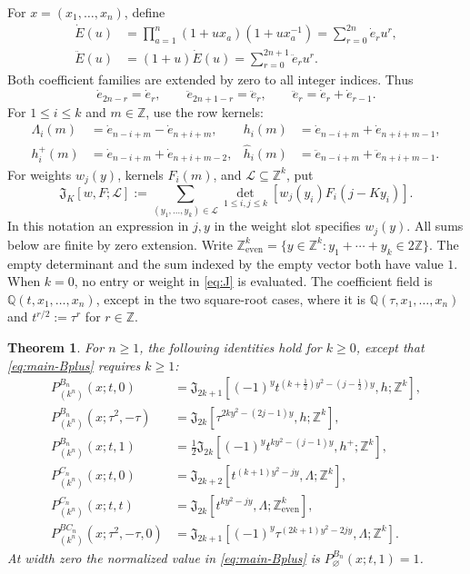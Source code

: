 \documentclass[12pt]{article}
\newtheorem{maintheorem}{Theorem}
\numberwithin{equation}{section}
\newcommand{\Q}{\mathbb Q}
\newcommand{\Z}{\mathbb Z}
\newcommand{\dote}{\dot e}
\newcommand{\ddote}{\ddot e}
\newcommand{\dotE}{\dot E}
\newcommand{\ddotE}{\ddot E}
\newcommand{\Jaff}{\mathfrak J}
\newcommand{\latticeeven}{\Z_{\mathrm{even}}^k}
\begin{document}
For $x=(x_1,\ldots,x_n)$, define
\begin{equation}\label{eq:elementary}
\begin{aligned}
 \dotE(u)&=\prod_{a=1}^n(1+ux_a)(1+ux_a^{-1})
          =\sum_{r=0}^{2n}\dote_r u^r,\\
 \ddotE(u)&=(1+u)\dotE(u)=\sum_{r=0}^{2n+1}\ddote_r u^r.
\end{aligned}
\end{equation}
Both coefficient families are extended by zero to all integer indices.
Thus
\[
 \dote_{2n-r}=\dote_r,\qquad
 \ddote_{2n+1-r}=\ddote_r,\qquad
 \ddote_r=\dote_r+\dote_{r-1}.
\]
For $1\le i\le k$ and $m\in\Z$, use the row kernels:
\begin{align*}
 \Lambda_i(m)&=\dote_{n-i+m}-\dote_{n+i+m},&
 h_i(m)&=\dote_{n-i+m}+\dote_{n+i+m-1},\\
 h_i^+(m)&=\dote_{n-i+m}+\dote_{n+i+m-2},&
 \widehat h_i(m)&=\ddote_{n-i+m}+\ddote_{n+i+m-1}.
\end{align*}
For weights $w_j(y)$, kernels $F_i(m)$, and
$\mathcal L\subseteq\Z^k$, put
\begin{equation}\label{eq:J}
 \Jaff_K[w,F;\mathcal L]
 :=\sum_{(y_1,\ldots,y_k)\in\mathcal L}
       \det_{1\le i,j\le k}[w_j(y_i)F_i(j-Ky_i)].
\end{equation}
In this notation an expression in $j,y$ in the weight slot specifies
$w_j(y)$.  All sums below are finite by zero extension.  Write
$\latticeeven=\{y\in\Z^k:y_1+\cdots+y_k\in2\Z\}$.
The empty determinant and the sum indexed by the empty vector both have
value $1$.  When $k=0$, no entry or weight in \eqref{eq:J} is evaluated.
The coefficient field is $\Q(t,x_1,\ldots,x_n)$, except in the
two square-root cases, where it is $\Q(\tau,x_1,\ldots,x_n)$ and
$t^{r/2}:=\tau^r$ for $r\in\Z$.

\begin{maintheorem}\label{thm:A}
For $n\ge1$, the following identities hold for $k\ge0$, except that
\eqref{eq:main-Bplus} requires $k\ge1$:
\begin{align}
 P_{(k^n)}^{B_n}(x;t,0)
 &=\Jaff_{2k+1}[(-1)^y t^{(k+\frac12)y^2-(j-\frac12)y},h;\Z^k],
 \label{eq:main-B0}\\
 P_{(k^n)}^{B_n}(x;\tau^2,-\tau)
 &=\Jaff_{2k}[\tau^{2ky^2-(2j-1)y},h;\Z^k],
 \label{eq:main-Bminus}\\
 P_{(k^n)}^{B_n}(x;t,1)
 &=\tfrac12\Jaff_{2k}[(-1)^y t^{ky^2-(j-1)y},h^+;\Z^k],
 \label{eq:main-Bplus}\\
 P_{(k^n)}^{C_n}(x;t,0)
 &=\Jaff_{2k+2}[t^{(k+1)y^2-jy},\Lambda;\Z^k],
 \label{eq:main-C0}\\
 P_{(k^n)}^{C_n}(x;t,t)
 &=\Jaff_{2k}[t^{ky^2-jy},\Lambda;\latticeeven],
 \label{eq:main-Ct}\\
 P_{(k^n)}^{BC_n}(x;\tau^2,-\tau,0)
 &=\Jaff_{2k+1}[(-1)^y\tau^{(2k+1)y^2-2jy},\Lambda;\Z^k].
 \label{eq:main-BC}
\end{align}
At width zero the normalized value in \eqref{eq:main-Bplus} is
$P_{\varnothing}^{B_n}(x;t,1)=1$.
\end{maintheorem}
\end{document}

